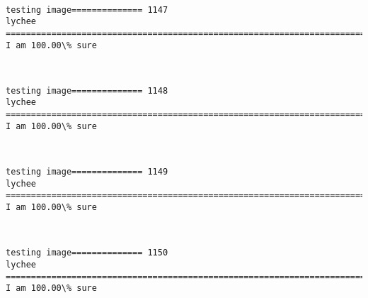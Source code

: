 \documentclass[11pt]{article}
\begin{document}
    \begin{center}
    \end{center}
    { \hspace*{\fill} \\}
    
    \begin{Verbatim}[commandchars=\\\{\}]
testing image============== 1147
lychee
============================================================================
I am 100.00\% sure

    \end{Verbatim}

    \begin{center}
    \end{center}
    { \hspace*{\fill} \\}
    
    \begin{Verbatim}[commandchars=\\\{\}]
testing image============== 1148
lychee
============================================================================
I am 100.00\% sure

    \end{Verbatim}

    \begin{center}
    \end{center}
    { \hspace*{\fill} \\}
    
    \begin{Verbatim}[commandchars=\\\{\}]
testing image============== 1149
lychee
============================================================================
I am 100.00\% sure

    \end{Verbatim}

    \begin{center}
    \end{center}
    { \hspace*{\fill} \\}
    
    \begin{Verbatim}[commandchars=\\\{\}]
testing image============== 1150
lychee
============================================================================
I am 100.00\% sure

    \end{Verbatim}
\end{document}
